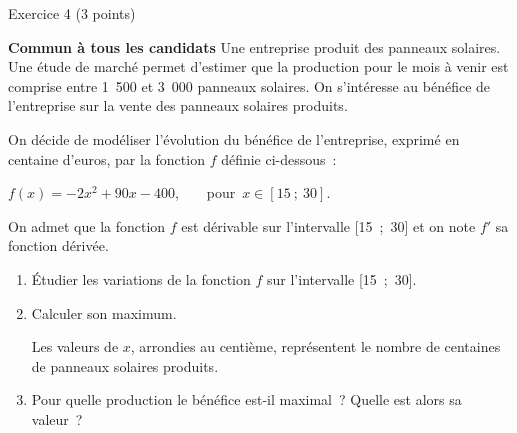 
\begin{h2}Exercice 4 (3 points)\end{h2}
\textbf{Commun à  tous les candidats}
\medbreak
Une entreprise produit des panneaux solaires. Une étude de marché permet d'estimer que la production
pour le mois à venir est comprise entre 1~500 et 3~000 panneaux solaires. On s'intéresse au
bénéfice de l'entreprise sur la vente des panneaux solaires produits.
\par
On décide de modéliser l'évolution du bénéfice de l'entreprise, exprimé en centaine d'euros, par la
fonction $f$ définie ci-dessous~:
\begin{center}
$f(x) = - 2x^2 + 90x - 400$, ~ ~ pour~$x \in  [15~;~30]$.
\end{center}
On admet que la fonction $f$ est dérivable sur l'intervalle [15~;~30] et on note $f'$ sa fonction dérivée.
\medbreak
\begin{enumerate}
     \item Étudier les variations de la fonction $f$ sur l'intervalle [15~;~30].
     \item  Calculer son maximum.
     \par
     Les valeurs de $x$, arrondies au centième, représentent le nombre de centaines de panneaux solaires
     produits.
     \item  Pour quelle production le bénéfice est-il maximal~? Quelle est alors sa valeur~?
\end{enumerate}
